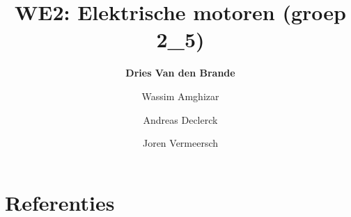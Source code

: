 \documentclass[12pt]{article}
\title{WE2: Elektrische motoren (groep 2\_5)}
\author{\textbf{Dries Van den Brande} \and Wassim Amghizar 
\and Andreas Declerck \and Joren Vermeersch}
\begin{document}
\maketitle













\section{Referenties}
\end{document}
